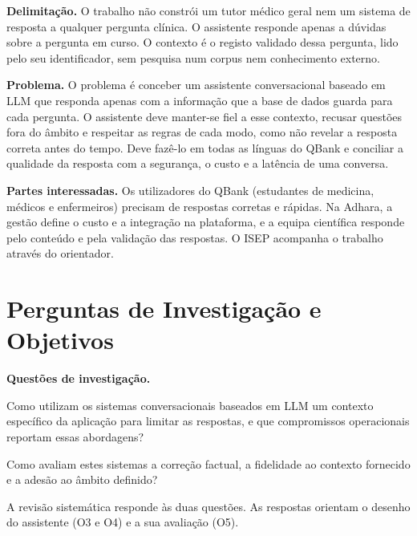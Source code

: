 \documentclass[11pt,a4paper]{article}
\begin{document}
\textbf{Delimitação.} O trabalho não constrói um tutor médico geral nem um sistema de resposta a qualquer pergunta clínica. O assistente responde apenas a dúvidas sobre a pergunta em curso. O contexto é o registo validado dessa pergunta, lido pelo seu identificador, sem pesquisa num corpus nem conhecimento externo.

\textbf{Problema.} O problema é conceber um assistente conversacional baseado em LLM que responda apenas com a informação que a base de dados guarda para cada pergunta. O assistente deve manter-se fiel a esse contexto, recusar questões fora do âmbito e respeitar as regras de cada modo, como não revelar a resposta correta antes do tempo. Deve fazê-lo em todas as línguas do QBank e conciliar a qualidade da resposta com a segurança, o custo e a latência de uma conversa.

\textbf{Partes interessadas.} Os utilizadores do QBank (estudantes de medicina, médicos e enfermeiros) precisam de respostas corretas e rápidas. Na Adhara, a gestão define o custo e a integração na plataforma, e a equipa científica responde pelo conteúdo e pela validação das respostas. O ISEP acompanha o trabalho através do orientador.

\section{Perguntas de Investigação e Objetivos}

\textbf{Questões de investigação.}
\begin{description}[leftmargin=1.2cm, labelwidth=1cm]
    \item[RQ1] Como utilizam os sistemas conversacionais baseados em LLM um contexto específico da aplicação para limitar as respostas, e que compromissos operacionais reportam essas abordagens?
    \item[RQ2] Como avaliam estes sistemas a correção factual, a fidelidade ao contexto fornecido e a adesão ao âmbito definido?
\end{description}
A revisão sistemática responde às duas questões. As respostas orientam o desenho do assistente (O3 e O4) e a sua avaliação (O5).
\end{document}
